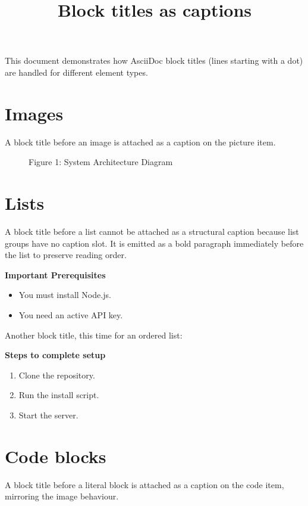 \documentclass[11pt,a4paper]{article}
\title{Block titles as captions}
\begin{document}
\maketitle

This document demonstrates how AsciiDoc block titles (lines starting with a dot) are handled for different element types.

\section{Images}

A block title before an image is attached as a caption on the picture item.

\begin{figure}[h]
\caption{Figure 1: System Architecture Diagram}
\end{figure}

\section{Lists}

A block title before a list cannot be attached as a structural caption because list groups have no caption slot. It is emitted as a bold paragraph immediately before the list to preserve reading order.

\textbf{Important Prerequisites}

\begin{itemize}
\item You must install Node.js.
\item You need an active API key.
\end{itemize}

Another block title, this time for an ordered list:

\textbf{Steps to complete setup}

\begin{enumerate}
\item Clone the repository.
\item Run the install script.
\item Start the server.
\end{enumerate}

\section{Code blocks}

A block title before a literal block is attached as a caption on the code item, mirroring the image behaviour.
\end{document}

